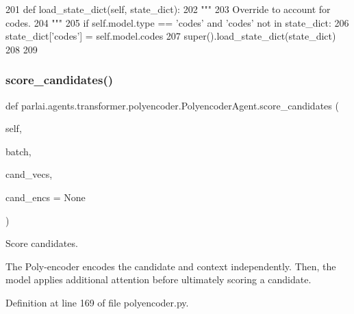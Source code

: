 \begin{DoxyCode}
201     \textcolor{keyword}{def }load\_state\_dict(self, state\_dict):
202         \textcolor{stringliteral}{"""}
203 \textcolor{stringliteral}{        Override to account for codes.}
204 \textcolor{stringliteral}{        """}
205         \textcolor{keywordflow}{if} self.model.type == \textcolor{stringliteral}{'codes'} \textcolor{keywordflow}{and} \textcolor{stringliteral}{'codes'} \textcolor{keywordflow}{not} \textcolor{keywordflow}{in} state\_dict:
206             state\_dict[\textcolor{stringliteral}{'codes'}] = self.model.codes
207         super().load\_state\_dict(state\_dict)
208 
209 
\end{DoxyCode}
\mbox{\label{classparlai_1_1agents_1_1transformer_1_1polyencoder_1_1PolyencoderAgent_ad75794f4004267ab538258bc2571235f}} 
\subsubsection{\texorpdfstring{score\+\_\+candidates()}{score\_candidates()}}
{\footnotesize\ttfamily def parlai.\+agents.\+transformer.\+polyencoder.\+Polyencoder\+Agent.\+score\+\_\+candidates (\begin{DoxyParamCaption}\item[{}]{self,  }\item[{}]{batch,  }\item[{}]{cand\+\_\+vecs,  }\item[{}]{cand\+\_\+encs = {\ttfamily None} }\end{DoxyParamCaption})}

\begin{DoxyVerb}Score candidates.

The Poly-encoder encodes the candidate and context independently. Then, the
model applies additional attention before ultimately scoring a candidate.
\end{DoxyVerb}
 

Definition at line 169 of file polyencoder.\+py.


